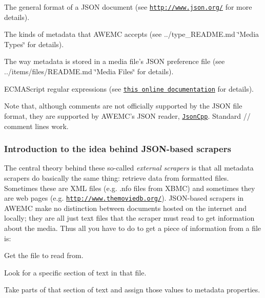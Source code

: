 \begin{DoxyItemize}
\item The general format of a J\-S\-O\-N document (see \href{http://www.json.org/}{\tt http\-://www.\-json.\-org/} for more details).
\item The kinds of metadata that A\-W\-E\-M\-C accepts (see ../type\-\_\-\-R\-E\-A\-D\-M\-E.md \char`\"{}\-Media Types\char`\"{} for details).
\item The way metadata is stored in a media file's J\-S\-O\-N preference file (see ../items/files/\-R\-E\-A\-D\-M\-E.md \char`\"{}\-Media Files\char`\"{} for details).
\item E\-C\-M\-A\-Script regular expressions (see \href{http://www.cplusplus.com/reference/regex/ECMAScript/}{\tt this online documentation} for details).
\end{DoxyItemize}

Note that, although comments are not officially supported by the J\-S\-O\-N file format, they are supported by A\-W\-E\-M\-C's J\-S\-O\-N reader, \href{http://jsoncpp.sourceforge.net}{\tt Json\-Cpp}. Standard {\ttfamily // comment} lines work.

\subsubsection*{Introduction to the idea behind J\-S\-O\-N-\/based scrapers}

The central theory behind these so-\/called {\itshape external scrapers} is that all metadata scrapers do basically the same thing\-: retrieve data from formatted files. Sometimes these are X\-M\-L files (e.\-g. .nfo files from X\-B\-M\-C) and sometimes they are web pages (e.\-g. \href{http://www.themoviedb.org/}{\tt http\-://www.\-themoviedb.\-org/}). J\-S\-O\-N-\/based scrapers in A\-W\-E\-M\-C make no distinction between documents hosted on the internet and locally; they are all just text files that the scraper must read to get information about the media. Thus all you have to do to get a piece of information from a file is\-:


\begin{DoxyEnumerate}
\item Get the file to read from.
\item Look for a specific section of text in that file.
\item Take parts of that section of text and assign those values to metadata properties.
\end{DoxyEnumerate}

